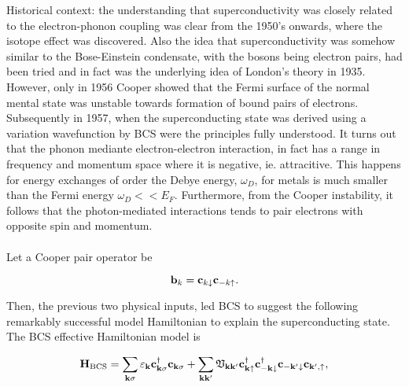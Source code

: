 \documentclass{homework}
\begin{document}
Historical context: the understanding that superconductivity was closely related to the electron-phonon coupling was clear from the 1950's onwards, where the isotope effect was discovered. Also the idea that superconductivity was somehow similar to the Bose-Einstein condensate, with the bosons being electron pairs, had been tried and in fact was the underlying idea of London's theory in 1935. However, only in 1956 Cooper showed that the Fermi surface of the normal mental state was unstable towards formation of bound pairs of electrons. Subsequently in 1957, when the superconducting state was derived using a variation wavefunction by BCS were the principles fully understood. It turns out that the phonon mediante electron-electron interaction, in fact has a range in frequency and momentum space where it is negative, ie. attracitive. This happens for energy exchanges of order the Debye energy, $\omega_D$, for metals is much smaller than the Fermi energy $\omega_D << E_F$. Furthermore, from the Cooper instability, it follows that the photon-mediated interactions tends to pair electrons with opposite spin and momentum. \\

\blanky \\

Let a Cooper pair operator be

\begin{equation}
    {\bf b}_k = {\bf c}_{k \downarrow} {\bf c}_{-k \uparrow}.
\end{equation}

Then, the previous two physical inputs, led BCS to suggest the following remarkably successful model Hamiltonian to explain the superconducting state. The BCS effective Hamiltonian model is 

\begin{equation}
    {\bf H}_{\textnormal{BCS}} = \sum_{{\bf k} \sigma} \varepsilon_{{\bf k}} {\bf c}_{{\bf k} \sigma}^\dagger {\bf c}_{{\bf k} \sigma} + \sum_{{\bf k} {\bf k}'} {\mathfrak{V}}_{{\bf k}{\bf k}'} {\bf c}_{{\bf k} \uparrow}^\dagger {\bf c}_{-{\bf k} \downarrow}^\dagger {\bf c}_{-{\bf k}' \downarrow} {\bf c}_{{\bf k}', \uparrow}, 
\end{equation}
\end{document}

